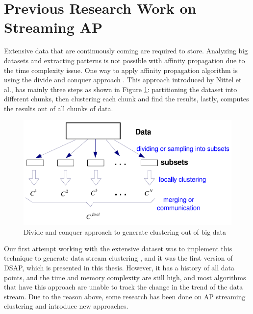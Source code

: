 \documentclass[../UNBThesis2.tex]{subfiles}
\begin{document}
\section{Previous Research Work on Streaming AP }
Extensive data that are continuously coming are required to store. Analyzing big datasets and extracting patterns is not possible with affinity propagation due to the time complexity issue.
One way to apply affinity propagation algorithm is using the divide and conquer approach \cite{khalilian2016data}. This approach introduced by Nittel et al.\cite{nittel2004scaling}, has mainly three steps as shown in Figure \ref{dividee}: partitioning the dataset into different chunks, then clustering each chunk and find the results, lastly, computes the results out of all chunks of data. 

\begin{figure}[!h]
    \centering
    \includegraphics[width = 11 cm]{image/Chapters/Chapter3/divide.PNG}
    \caption{Divide and conquer approach to generate clustering out of big data \protect\cite{zhang2009toward}}
    \label{dividee}
\end{figure}


Our first attempt working with the extensive dataset was to implement this technique to generate data stream clustering \cite{ivarispatio}, and it was the first version of DSAP, which is presented in this thesis. However, it has a history of all data points, and the time and memory complexity are still high, and most algorithms that have this approach are unable to track the change in the trend of the data stream. 
Due to the reason above, some research has been done on AP streaming clustering and introduce new approaches.
\end{document}

